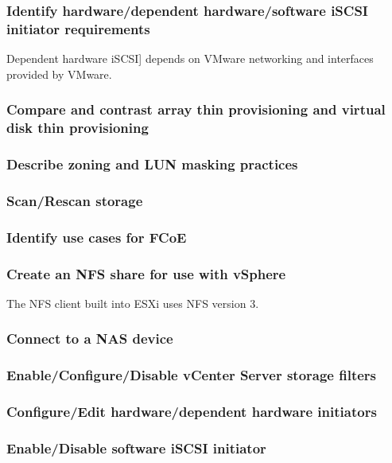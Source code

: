 \subsubsection{Identify hardware/dependent hardware/software iSCSI initiator requirements}

Dependent hardware iSCSI] depends on VMware networking and interfaces provided
by VMware.

\subsubsection{Compare and contrast array thin provisioning and virtual disk thin provisioning}

\subsubsection{Describe zoning and LUN masking practices}

\subsubsection{Scan/Rescan storage}

\subsubsection{Identify use cases for FCoE}

\subsubsection{Create an NFS share for use with vSphere}

The NFS client built into ESXi uses NFS version 3.

\subsubsection{Connect to a NAS device}

\subsubsection{Enable/Configure/Disable vCenter Server storage filters}

\subsubsection{Configure/Edit hardware/dependent hardware initiators}

\subsubsection{Enable/Disable software iSCSI initiator}

